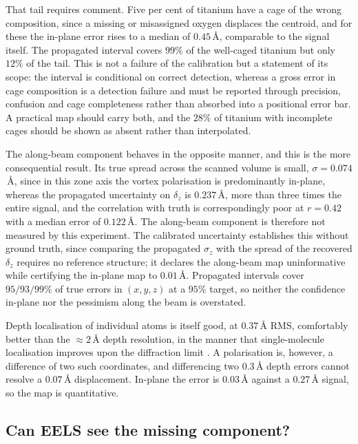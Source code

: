 \documentclass[aps,prb,twocolumn,superscriptaddress,floatfix,nofootinbib]{revtex4-2}
\begin{document}
That tail requires comment. Five per cent of titanium have a cage of the wrong composition,
since a missing or misassigned oxygen displaces the centroid, and for these the in-plane error
rises to a median of $0.45$\,\AA, comparable to the signal itself. The propagated interval
covers $99\%$ of the well-caged titanium but only $12\%$ of the tail. This is not a failure of
the calibration but a statement of its scope: the interval is conditional on correct detection,
whereas a gross error in cage composition is a detection failure and must be reported through
precision, confusion and cage completeness rather than absorbed into a positional error bar. A
practical map should carry both, and the $28\%$ of titanium with incomplete cages should be
shown as absent rather than interpolated.

The along-beam component behaves in the opposite manner, and this is the more consequential
result. Its true spread across the scanned volume is small, $\sigma=0.074$\,\AA, since in this
zone axis the vortex polarisation is predominantly in-plane, whereas the propagated uncertainty
on $\delta_z$ is $0.237$\,\AA, more than three times the entire signal, and the correlation with
truth is correspondingly poor at $r=0.42$ with a median error of $0.122$\,\AA. The along-beam
component is therefore not measured by this experiment. The calibrated uncertainty establishes
this without ground truth, since comparing the propagated $\sigma_z$ with the spread of the
recovered $\delta_z$ requires no reference structure; it declares the along-beam map
uninformative while certifying the in-plane map to $0.01$\,\AA. Propagated intervals cover $95/93/99\%$ of
true errors in $(x,y,z)$ at a $95\%$ target, so neither the confidence in-plane nor the
pessimism along the beam is overstated.

Depth localisation of individual atoms is itself good, at $0.37$\,\AA{} RMS, comfortably better
than the $\approx2$\,\AA{} depth resolution, in the manner that single-molecule localisation
improves upon the diffraction limit \citep{Thompson2002}. A polarisation is, however, a
difference of two such coordinates, and differencing two $0.3$\,\AA{} depth errors cannot
resolve a $0.07$\,\AA{} displacement. In-plane the error is $0.03$\,\AA{} against a
$0.27$\,\AA{} signal, so the map is quantitative.

\subsection{Can EELS see the missing component?}
\end{document}
